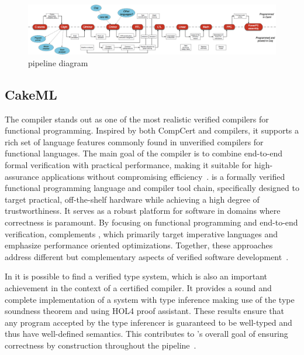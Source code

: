 \begin{figure}[H]
    \centering
    \includegraphics[width=\linewidth]{images/compcert_diagram.png}
    \caption{\compcert pipeline diagram~\cite{hal-01643290, CompCertPipeline}}
    \label{fig:CompCertPipeline}
\end{figure}

\subsection{CakeML}
\label{sec:CakeML}

The \cml compiler stands out as one of the most realistic verified compilers for functional programming. Inspired by both CompCert 
and \ocaml compilers, it supports a rich set of language features commonly found in unverified compilers for functional languages. The 
main goal of the \cml compiler is to combine end-to-end formal verification with practical performance, making it suitable 
for high-assurance applications without compromising efficiency~\cite{TanMKFON19}. \cml is a formally verified functional programming 
language and compiler tool chain, specifically designed to target practical, off-the-shelf hardware while achieving a high degree of 
trustworthiness. It serves as a robust platform for software in domains where correctness is paramount. By focusing on functional 
programming and end-to-end verification, \cml complements \compcert, which primarily target imperative languages and emphasize 
performance oriented optimizations. Together, these approaches address different but complementary aspects of verified software 
development~\cite{POPL14}.

In \cml it is possible to find a verified type system, which is also an important achievement in the context of a certified compiler.
It provides a sound and complete implementation of a system with type inference making use of the type soundness theorem and using HOL4
proof assistant. These results ensure that any \cml program accepted by the type inferencer is guaranteed to be 
well-typed and thus have well-defined semantics. This contributes to \cml's overall goal of ensuring correctness by construction 
throughout the pipeline~\cite{TanOK15}.

